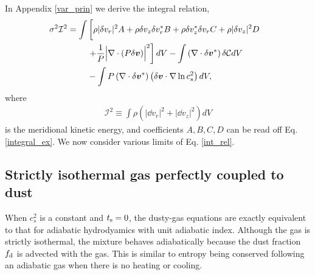 In Appendix
\ref{var_prin} we derive the integral relation,  
\begin{align}
  \sigma^2\mathcal{I}^2
&= \int\left[ \rho
  |\dd v_r|^2A + \rho  \dd v_z \dd v_r^* B + \rho \dd v_z^*\dd v_r C +
  \rho |\dd v_z|^2 D\phantom{\frac{1}{1}}\right. \notag\\
&\phantom{===}  \left. + \frac{1}{P}\Bigl\lvert \nabla\cdot\left(P\dd
  \bm{v}\right)\Bigr\rvert^2\right]dV  -\int \left(\nabla\cdot\dd\bm{v}^*\right)\dd\mathcal{C}dV \notag\\
&\phantom{===}
- \int P
  \left(\nabla\cdot\dd\bm{v}^*\right)\left(\dd\bm{v}\cdot\nabla\ln{c_s^2}\right)dV,\label{int_rel}
\end{align} 
where
\begin{align}
  \mathcal{I}^2 \equiv \int\rho\left(|\dd v_r|^2 + |\dd v_z|^2\right)dV
\end{align}
is the meridional kinetic energy, 
and coefficients $A,B,C,D$ can be
read off Eq. \ref{integral_ex}. %
We now consider various limits of Eq. \ref{int_rel}.    


\subsection{Strictly isothermal gas perfectly coupled to dust}\label{iso_perfect}
When $c_s^2$ is a constant and $t_\mathrm{s}=0$, the dusty-gas equations are
exactly equivalent to that for adiabatic hydrodyamics with unit adiabatic
index. Although the gas is strictly isothermal, the mixture behaves 
adiabatically because the dust fraction $f_\mathrm{d}$ is advected with 
the gas. This is similar to entropy being conserved following an
adiabatic gas when there is no heating or cooling.  

